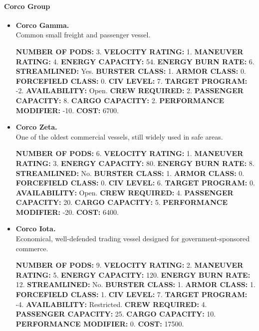 \paragraph{Corco Group}
\label{sec:hulls-corco}


  
\begin{itemize}
\item\textbf{Corco Gamma.}\\
  Common small freight and passenger vessel.
  
  \textbf{NUMBER OF PODS:} 3. \textbf{VELOCITY RATING:} 1.
  \textbf{MANEUVER RATING:} 4. \textbf{ENERGY CAPACITY:} 54.
  \textbf{ENERGY BURN RATE:} 6. \textbf{STREAMLINED:}
  Yes. \textbf{BURSTER CLASS:} 1. \textbf{ARMOR CLASS:} 0.
  \textbf{FORCEFIELD CLASS:} 0. \textbf{CIV LEVEL:} 7. \textbf{TARGET
    PROGRAM:} -2. \textbf{AVAILABILITY:} Open. \textbf{CREW REQUIRED:}
  2.  \textbf{PASSENGER CAPACITY:} 8. \textbf{CARGO CAPACITY:} 2.
  \textbf{PERFORMANCE MODIFIER:} -10. \textbf{COST:} 6700.
  

\item\textbf{Corco Zeta.}\\
  One of the oldest commercial vessels, still widely used in safe
  areas.
  
  \textbf{NUMBER OF PODS:} 6. \textbf{VELOCITY RATING:} 1.
  \textbf{MANEUVER RATING:} 3. \textbf{ENERGY CAPACITY:} 80.
  \textbf{ENERGY BURN RATE:} 8. \textbf{STREAMLINED:}
  No. \textbf{BURSTER CLASS:} 1. \textbf{ARMOR CLASS:} 0.
  \textbf{FORCEFIELD CLASS:} 0. \textbf{CIV LEVEL:} 6. \textbf{TARGET
    PROGRAM:} 0. \textbf{AVAILABILITY:} Open. \textbf{CREW REQUIRED:} 4.
  \textbf{PASSENGER CAPACITY:} 20. \textbf{CARGO CAPACITY:} 5.
  \textbf{PERFORMANCE MODIFIER:} -20. \textbf{COST:} 6400.
  

\item\textbf{Corco Iota.}\\
  Economical, well-defended trading vessel designed for
  government-sponsored commerce.
  
  \textbf{NUMBER OF PODS:} 9. \textbf{VELOCITY RATING:} 2.
  \textbf{MANEUVER RATING:} 5. \textbf{ENERGY CAPACITY:} 120.
  \textbf{ENERGY BURN RATE:} 12. \textbf{STREAMLINED:}
  No. \textbf{BURSTER CLASS:} 1. \textbf{ARMOR CLASS:} 1.
  \textbf{FORCEFIELD CLASS:} 1. \textbf{CIV LEVEL:} 7. \textbf{TARGET
    PROGRAM:} -4. \textbf{AVAILABILITY:} Restricted. \textbf{CREW
    REQUIRED:} 4.  \textbf{PASSENGER CAPACITY:} 25. \textbf{CARGO
    CAPACITY:} 10. \textbf{PERFORMANCE MODIFIER:} 0. \textbf{COST:}
  17500.


\end{itemize}
